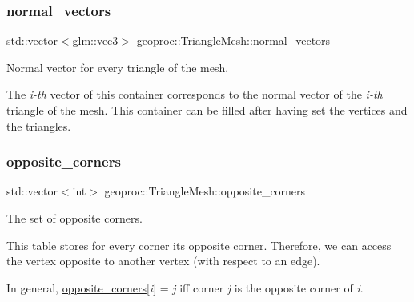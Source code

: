 \subsubsection{\texorpdfstring{normal\+\_\+vectors}{normal\_vectors}}
{\footnotesize\ttfamily std\+::vector$<$glm\+::vec3$>$ geoproc\+::\+Triangle\+Mesh\+::normal\+\_\+vectors\hspace{0.3cm}{\ttfamily [protected]}}



Normal vector for every triangle of the mesh. 

The {\itshape i-\/th} vector of this container corresponds to the normal vector of the {\itshape i-\/th} triangle of the mesh. This container can be filled after having set the vertices and the triangles. \mbox{\label{classgeoproc_1_1TriangleMesh_a2604795c90c694116513252b86d242b4}} 
\subsubsection{\texorpdfstring{opposite\+\_\+corners}{opposite\_corners}}
{\footnotesize\ttfamily std\+::vector$<$int$>$ geoproc\+::\+Triangle\+Mesh\+::opposite\+\_\+corners\hspace{0.3cm}{\ttfamily [protected]}}



The set of opposite corners. 

This table stores for every corner its opposite corner. Therefore, we can access the vertex opposite to another vertex (with respect to an edge).

In general, \hyperlink{classgeoproc_1_1TriangleMesh_a2604795c90c694116513252b86d242b4}{opposite\+\_\+corners}\mbox{[}{\itshape i}\mbox{]} = {\itshape j} iff corner {\itshape j} is the opposite corner of {\itshape i}.

